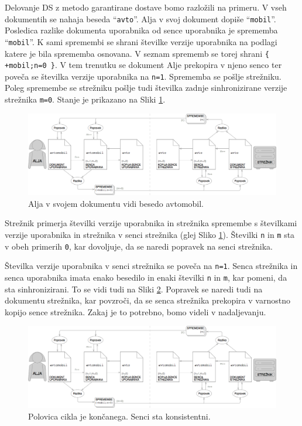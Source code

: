 \documentclass[a4paper, 12pt, twoside]{book}
\begin{document}
Delovanje DS z metodo garantirane dostave bomo razložili na primeru. V vseh dokumentih se nahaja beseda “{\tt avto}”. Alja v svoj dokument dopiše “{\tt mobil}”. Posledica razlike dokumenta uporabnika od sence uporabnika je sprememba “{\tt mobil}”. K sami spremembi se shrani številke verzije uporabnika na podlagi katere je bila sprememba osnovana. V seznam sprememb se torej shrani {\tt \{ +mobil;n=0 \}}. V tem trenutku se dokument Alje prekopira v njeno senco ter poveča se številka verzije uporabnika na {\tt n=1}. Sprememba se pošlje strežniku. Poleg spremembe se strežniku pošlje tudi številka zadnje sinhronizirane verzije strežnika {\tt m=0}. Stanje je prikazano na Sliki \ref{ds4}.

\begin{figure}[placement h]
\begin{center}
\includegraphics[width=16cm]{ds4.png}
\end{center}
\caption{Alja v svojem dokumentu vidi besedo avtomobil.}
\label{ds4}
\end{figure}

Strežnik primerja številki verzije uporabnika in strežnika spremembe s številkami verzije uporabnika in strežnika v senci strežnika (glej Sliko \ref{ds4}). Številki {\tt n} in {\tt m} sta v obeh primerih {\tt 0}, kar dovoljuje, da se naredi popravek na senci strežnika.

\pagebreak

Številka verzije uporabnika v senci strežnika se poveča na {\tt n=1}. Senca strežnika in senca uporabnika imata enako besedilo in enaki številki {\tt n} in {\tt m}, kar pomeni, da sta sinhronizirani. To se vidi tudi na Sliki \ref{ds5}. Popravek se naredi tudi na dokumentu strežnika, kar povzroči, da se senca strežnika prekopira v varnostno kopijo sence strežnika. Zakaj je to potrebno, bomo videli v nadaljevanju.

\begin{figure}[placement h]
\begin{center}
\includegraphics[width=16cm]{ds5.png}
\end{center}
\caption{Polovica cikla je končanega. Senci sta konsistentni.}
\label{ds5}
\end{figure}
\end{document}
